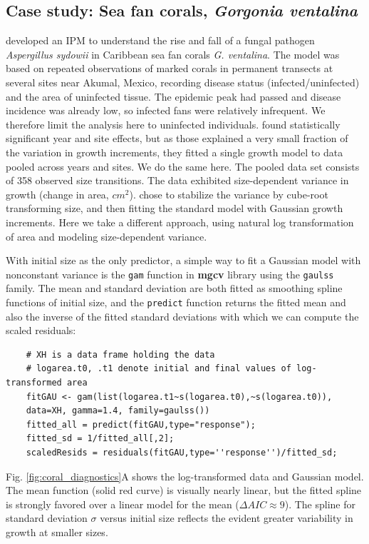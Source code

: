\documentclass[12pt]{article}
\begin{document}
\subsection{Case study: Sea fan corals, \emph{Gorgonia ventalina}}
\label{sec:seafans}
\cite{bruno-etal-2011} developed an IPM to understand the rise and fall of a fungal pathogen \emph{Aspergillus sydowii} in Caribbean sea fan corals \emph{G. ventalina}. 
The model was based on repeated observations of marked corals in permanent transects at several sites near Akumal, Mexico, recording disease status (infected/uninfected) and the area of uninfected tissue. 
The epidemic peak had passed and disease incidence was already low, so infected fans were relatively infrequent. 
We therefore limit the analysis here to uninfected individuals.
\citet{bruno-etal-2011} found statistically significant year and site effects, but as those explained a very small fraction of the variation in growth increments, they fitted a single growth model to data pooled across years and sites. 
We do the same here. 
The pooled data set consists of 358 observed size transitions. 
The data exhibited size-dependent variance in growth (change in area, $cm^2$).  
\cite{bruno-etal-2011} chose to stabilize the variance by cube-root transforming size, and then fitting the standard model with Gaussian growth increments. 
Here we take a different approach, using natural log transformation of area and modeling size-dependent variance. 

With initial size as the only predictor, a simple way to fit a Gaussian model with nonconstant variance is the \texttt{gam} function in \textbf{mgcv} library \citep{wood-2017} using the \texttt{gaulss} family. 
The mean and standard deviation are both fitted as smoothing spline functions of initial size, and the \texttt{predict} function returns the fitted mean and also the inverse of the fitted standard deviations with which we can compute the scaled residuals: 
\begin{lstlisting}
	# XH is a data frame holding the data
	# logarea.t0, .t1 denote initial and final values of log-transformed area   
	fitGAU <- gam(list(logarea.t1~s(logarea.t0),~s(logarea.t0)),
	data=XH, gamma=1.4, family=gaulss())
	fitted_all = predict(fitGAU,type="response"); 
	fitted_sd = 1/fitted_all[,2]; 
	scaledResids = residuals(fitGAU,type=''response'')/fitted_sd;  
\end{lstlisting}
Fig. \ref{fig:coral_diagnostics}A shows the log-transformed data and Gaussian model. 
The mean function (solid red curve) is visually nearly linear, but the fitted spline is strongly favored over a linear model for the mean ($\Delta AIC \approx 9$). 
The spline for standard deviation $\sigma$ versus initial size reflects the evident greater variability in growth at smaller sizes.  
\end{document}
